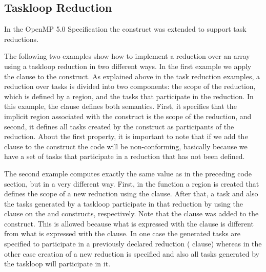 


\subsection{Taskloop Reduction}
\label{subsec:taskloop_reduction}

In the OpenMP 5.0 Specification the  construct
was extended to support task reductions.

The following two examples show how to implement a reduction over an array
using a taskloop reduction in two different ways.
In the first
example we apply the  clause to the  construct. As 
explained above in the task reduction examples, a reduction over tasks is
divided into two components: the scope of the reduction, which is defined by a
 region, and the tasks that participate in the reduction. In this
example, the  clause defines both semantics. First, it specifies that
the implicit  region associated with the  construct is the scope of the
reduction, and second, it defines all tasks created by the  construct as
participants of the reduction. About the first property, it is important to note
that if we add the  clause to the  construct the code will be
non-conforming, basically because we have a set of tasks that participate in a
reduction that has not been defined.


The second example computes exactly the same value as in the preceding  code section,
but in a very different way.
First, in the  function a  region is created 
that defines the scope of a new reduction using the  clause.
After that, a task and also the tasks generated by a taskloop participate in 
that reduction by using the  clause on the 
and  constructs, respectively. 
Note that the  clause was added to the  construct.
This is allowed because what is expressed with the  clause
is different from what is expressed with the  clause.
In one case the generated tasks are specified to participate in a previously 
declared reduction ( clause) whereas in the other case
creation of a new reduction is specified and also all tasks generated 
by the taskloop will participate in it.

